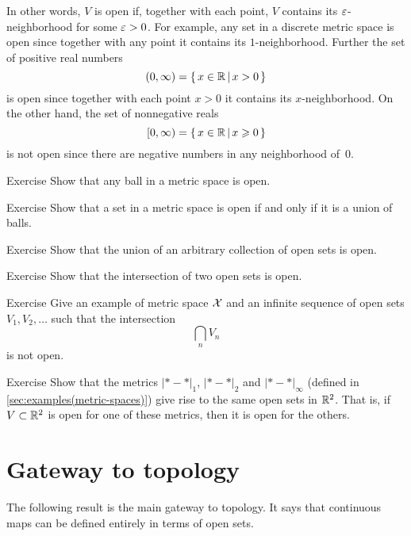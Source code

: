 In other words, $V$ is open if, together with each point, $V$ contains its $\varepsilon$-neighborhood for some $\varepsilon>0$.
For example, any set in a discrete metric space is open since together with any point it contains its $1$-neighborhood.
Further the set of positive real numbers
\[(0,\infty)=\left\{\,{x\in\mathbb{R}}\,\middle|\,{x>0}\,\right\}\] 
is open since together with each point $x>0$ it contains its $x$-neighborhood.
On the other hand, the set of nonnegative reals 
\[[0,\infty)=\left\{\,{x\in\mathbb{R}}\,\middle|\,{x\geqslant0}\,\right\}\]
is not open since there are negative numbers in any neighborhood of~$0$.

\begin{thm}{Exercise}\label{ex:ball-is-open}
Show that any ball in a metric space is open.
\end{thm}

\begin{thm}{Exercise}
Show that a set in a metric space is open if and only if it is a union of balls. 
\end{thm}

\begin{thm}{Exercise}\label{ex:open-union} Show that the union of an arbitrary collection of open sets is open.
\end{thm}

\begin{thm}{Exercise}\label{ex:open-intersection}
Show that the intersection of two open sets is open.
\end{thm}

\begin{thm}{Exercise}
Give an example of metric space $\mathcal{X}$ and an infinite sequence of open sets $V_1,V_2,\dots$
such that the intersection
\[\bigcap_nV_n\]
is not open.
\end{thm}

\begin{thm}{Exercise}\label{ex:d1+d2+dinfty-open}
Show that the metrics $|{*}-{*}|_1$, $|{*}-{*}|_2$ and $|{*}-{*}|_\infty$ (defined in \ref{sec:examples(metric-spaces)})
give rise to the same open sets in $\mathbb{R}^2$.
That is, if $V\subset \mathbb{R}^2$ is open for one of these metrics, then it is open for the others.
\end{thm}

\section{Gateway to topology}

The following result is the main gateway to topology.
It says that continuous maps can be defined entirely in terms of open sets.

